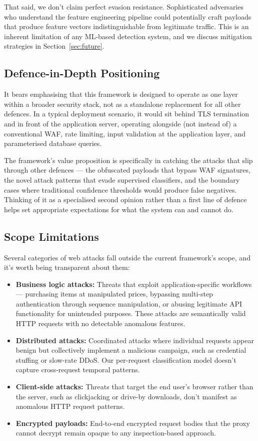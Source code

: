 \documentclass[journal,onecolumn]{IEEEtran}
\begin{document}
That said, we don't claim perfect evasion resistance. Sophisticated adversaries who understand the feature engineering pipeline could potentially craft payloads that produce feature vectors indistinguishable from legitimate traffic. This is an inherent limitation of any ML-based detection system, and we discuss mitigation strategies in Section~\ref{sec:future}.

\subsection{Defence-in-Depth Positioning}

It bears emphasising that this framework is designed to operate as one layer within a broader security stack, not as a standalone replacement for all other defences. In a typical deployment scenario, it would sit behind TLS termination and in front of the application server, operating alongside (not instead of) a conventional WAF, rate limiting, input validation at the application layer, and parameterised database queries.

The framework's value proposition is specifically in catching the attacks that slip through other defences --- the obfuscated payloads that bypass WAF signatures, the novel attack patterns that evade supervised classifiers, and the boundary cases where traditional confidence thresholds would produce false negatives. Thinking of it as a specialised second opinion rather than a first line of defence helps set appropriate expectations for what the system can and cannot do.

\subsection{Scope Limitations}

Several categories of web attacks fall outside the current framework's scope, and it's worth being transparent about them:

\begin{itemize}
\item \textbf{Business logic attacks:} Threats that exploit application-specific workflows --- purchasing items at manipulated prices, bypassing multi-step authentication through sequence manipulation, or abusing legitimate API functionality for unintended purposes. These attacks are semantically valid HTTP requests with no detectable anomalous features.
\item \textbf{Distributed attacks:} Coordinated attacks where individual requests appear benign but collectively implement a malicious campaign, such as credential stuffing or slow-rate DDoS. Our per-request classification model doesn't capture cross-request temporal patterns.
\item \textbf{Client-side attacks:} Threats that target the end user's browser rather than the server, such as clickjacking or drive-by downloads, don't manifest as anomalous HTTP request patterns.
\item \textbf{Encrypted payloads:} End-to-end encrypted request bodies that the proxy cannot decrypt remain opaque to any inspection-based approach.
\end{itemize}
\end{document}
